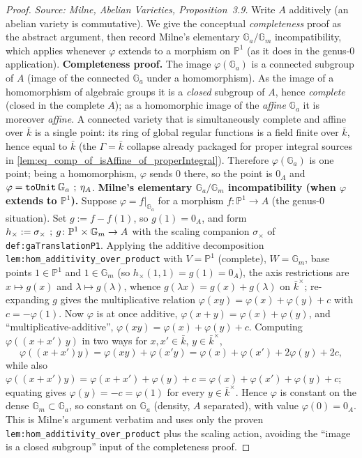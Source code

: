 \begin{proof}
  \textit{Source: Milne, Abelian Varieties, Proposition~3.9.}
  Write \(A\) additively (an abelian variety is commutative). We give the conceptual
  \emph{completeness} proof as the abstract argument, then record Milne's elementary \(\mathbb
  G_a/\mathbb G_m\) incompatibility, which applies whenever \(\varphi\) extends to a morphism on
  \(\mathbb P^1\) (as it does in the genus-\(0\) application).
  \textbf{Completeness proof.} The image \(\varphi(\mathbb G_a)\) is a connected subgroup of \(A\)
  (image of the connected \(\mathbb G_a\) under a homomorphism). As the image of a homomorphism of
  algebraic groups it is a \emph{closed} subgroup of \(A\), hence \emph{complete} (closed in the
  complete \(A\)); as a homomorphic image of the \emph{affine} \(\mathbb G_a\) it is moreover
  \emph{affine}. A connected variety that is simultaneously complete and affine over \(\bar k\) is a
  single point: its ring of global regular functions is a field finite over \(\bar k\), hence equal
  to \(\bar k\) (the \(\Gamma = \bar k\) collapse already packaged for proper integral sources in
  \cref{lem:eq_comp_of_isAffine_of_properIntegral}). Therefore \(\varphi(\mathbb G_a)\) is one point;
  being a homomorphism, \(\varphi\) sends \(0\) there, so the point is \(0_A\) and
  \(\varphi = \mathtt{toUnit}\,\mathbb G_a \fatsemi \eta_A\).
  \medskip
  \noindent\textbf{Milne's elementary \(\mathbb G_a/\mathbb G_m\) incompatibility (when \(\varphi\)
  extends to \(\mathbb P^1\)).} Suppose \(\varphi = f|_{\mathbb G_a}\) for a morphism
  \(f \colon \mathbb P^1 \to A\) (the genus-\(0\) situation). Set \(g := f - f(1)\), so \(g(1) = 0_A\), and
  form \(h_\times := \sigma_\times \fatsemi g \colon \mathbb P^1 \times \mathbb G_m \to A\) with the
  scaling companion \(\sigma_\times\) of \texttt{def:gaTranslationP1}. Applying the additive
  decomposition \texttt{lem:hom_additivity_over_product} with \(V = \mathbb P^1\) (complete),
  \(W = \mathbb G_m\), base points \(1 \in \mathbb P^1\) and \(1 \in \mathbb G_m\) (so
  \(h_\times(1, 1) = g(1) = 0_A\)), the axis restrictions are \(x \mapsto g(x)\) and
  \(\lambda \mapsto g(\lambda)\), whence \(g(\lambda x) = g(x) + g(\lambda)\) on \(\bar k^\times\);
  re-expanding \(g\) gives the multiplicative relation
  \(\varphi(xy) = \varphi(x) + \varphi(y) + c\) with \(c = -\varphi(1)\). Now \(\varphi\) is at once
  additive, \(\varphi(x + y) = \varphi(x) + \varphi(y)\), and ``multiplicative-additive'',
  \(\varphi(xy) = \varphi(x) + \varphi(y) + c\). Computing \(\varphi((x + x')\,y)\) in two ways for
  \(x, x' \in \bar k\), \(y \in \bar k^\times\),
  \[ \varphi((x+x')y) = \varphi(xy) + \varphi(x'y) = \varphi(x) + \varphi(x') + 2\varphi(y) + 2c, \]
  while also \(\varphi((x+x')y) = \varphi(x+x') + \varphi(y) + c = \varphi(x) + \varphi(x') +
  \varphi(y) + c\); equating gives \(\varphi(y) = -c = \varphi(1)\) for every \(y \in \bar k^\times\).
  Hence \(\varphi\) is constant on the dense \(\mathbb G_m \subset \mathbb G_a\), so constant on
  \(\mathbb G_a\) (density, \(A\) separated), with value \(\varphi(0) = 0_A\). This is Milne's argument
  verbatim and uses only the proven \texttt{lem:hom_additivity_over_product} plus the scaling action,
  avoiding the ``image is a closed subgroup'' input of the completeness proof. \qedhere
\end{proof}
